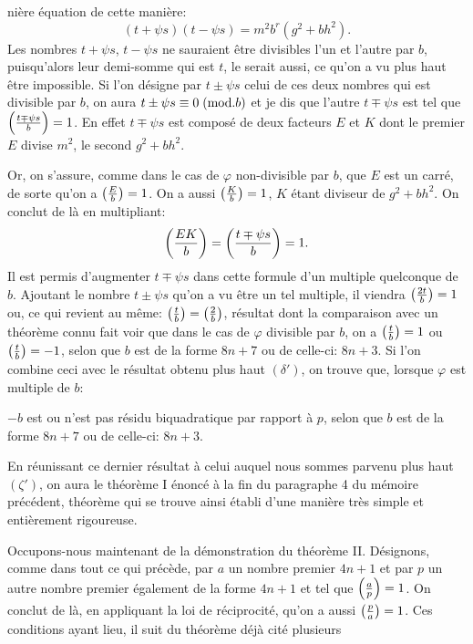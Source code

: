 \noindent
nière équation de cette manière:
\[
(t+\psi s)(t-\psi s)=m^2b^r(g^2+bh^2).
\]
Les nombres $t+\psi s$, $t-\psi s$ ne sauraient être divisibles l'un et l'autre par $b$,
puisqu'alors leur demi-somme qui est $t$, le serait aussi, ce qu'on a vu plus haut
être impossible. Si l'on désigne par $t\pm\psi s$ celui de ces deux nombres qui est
divisible par $b$, on aura $t\pm\psi s\equiv0\;(\mathrm{mod}.b)$ et je dis que l'autre $t\mp\psi s$ est tel
que $\left(\frac{t\mp\psi s}{b}\right)=1$. En effet $t\mp\psi s$ est composé de deux facteurs $E$ et $K$ dont
le premier $E$ divise $m^2$, le second $g^2+bh^2$.
\par\indent
Or, on s'assure, comme dans le cas de $\varphi$ non-divisible par $b$, que $E$
est un carré, de sorte qu'on a $\left(\frac{E}{b}\right)=1$. On a aussi $\left(\frac{K}{b}\right)=1$, $K$ étant diviseur
de $g^2+bh^2$. On conclut de là en multipliant:
\[
\left(\frac{EK}{b}\right)=\left(\frac{t\mp\psi s}{b}\right)=1.
\]
Il est permis d'augmenter $t\mp\psi s$ dans cette formule d'un multiple quelconque
de $b$. Ajoutant le nombre $t\pm\psi s$ qu'on a vu être un tel multiple, il viendra
$\left(\frac{2t}{b}\right)=1$ ou, ce qui revient au même: $\left(\frac{t}{b}\right)=\left(\frac{2}{b}\right)$, résultat dont la comparaison
avec un théorème connu fait voir que dans le cas de $\varphi$ divisible par $b$,
on a $\left(\frac{t}{b}\right)=1$ ou $\left(\frac{t}{b}\right)=-1$, selon que $b$ est de la forme $8n+7$ ou de
celle-ci: $8n+3$. Si l'on combine ceci avec le résultat obtenu plus haut $(\delta')$,
on trouve que, lorsque $\varphi$ est multiple de $b$:
\par\noindent\hspace*{.06\linewidth}\begin{minipage}{.94\linewidth}
$-b$ est ou n'est pas résidu biquadratique par rapport à $p$, selon que $b$
est de la forme $8n+7$ ou de celle-ci: $8n+3$.
\end{minipage}
\par\indent
En réunissant ce dernier résultat à celui auquel nous sommes parvenu
plus haut $(\zeta')$, on aura le théorème I énoncé à la fin du paragraphe 4 du mémoire
précédent, théorème qui se trouve ainsi établi d'une manière très simple
et entièrement rigoureuse.
\par\indent
Occupons-nous maintenant de la démonstration du théorème II. Désignons,
comme dans tout ce qui précède, par $a$ un nombre premier $4n+1$ et
par $p$ un autre nombre premier également de la forme $4n+1$ et tel que
$\left(\frac{a}{p}\right)=1$. On conclut de là, en appliquant la loi de réciprocité, qu'on a aussi
$\left(\frac{p}{a}\right)=1$. Ces conditions ayant lieu, il suit du théorème déjà cité plusieurs
